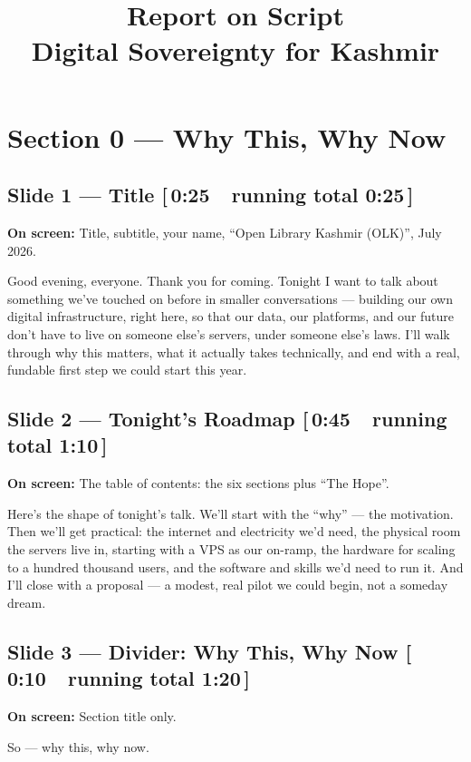 \documentclass[11pt]{article}
\title{\color{sovDark}\textbf{Report on Script}\\[4pt]\Large Digital Sovereignty for Kashmir}
\newcommand{\onscreen}[1]{\noindent\textbf{\color{sovGrey}On screen:} #1\par\vspace{4pt}}
\newcommand{\timing}[2]{\hfill{\normalsize\color{sovGrey}[\,#1\ \textbar\ running total #2\,]}}
\begin{document}
\maketitle

\clearpage
\section{Section 0 --- Why This, Why Now}

\subsection*{Slide 1 --- Title \timing{0:25}{0:25}}
\onscreen{Title, subtitle, your name, ``Open Library Kashmir (OLK)'', July 2026.}
\begin{sayit}
Good evening, everyone. Thank you for coming. Tonight I want to talk about something
we've touched on before in smaller conversations --- building our own digital
infrastructure, right here, so that our data, our platforms, and our future don't have
to live on someone else's servers, under someone else's laws. I'll walk through why this
matters, what it actually takes technically, and end with a real, fundable first step we
could start this year.
\end{sayit}

\subsection*{Slide 2 --- Tonight's Roadmap \timing{0:45}{1:10}}
\onscreen{The table of contents: the six sections plus ``The Hope''.}
\begin{sayit}
Here's the shape of tonight's talk. We'll start with the ``why'' --- the motivation.
Then we'll get practical: the internet and electricity we'd need, the physical room the
servers live in, starting with a VPS as our on-ramp, the hardware for scaling to a
hundred thousand users, and the software and skills we'd need to run it. And I'll close
with a proposal --- a modest, real pilot we could begin, not a someday dream.
\end{sayit}

\subsection*{Slide 3 --- Divider: Why This, Why Now \timing{0:10}{1:20}}
\onscreen{Section title only.}
\begin{sayit}
So --- why this, why now.
\end{sayit}
\end{document}
